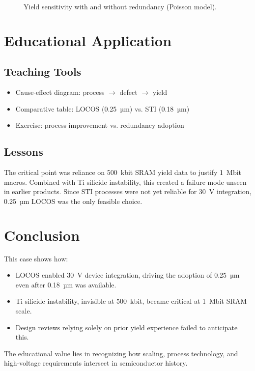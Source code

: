 \documentclass[conference]{IEEEtran}
\begin{document}
\begin{figure}[!t]
  \centering
  \caption{Yield sensitivity with and without redundancy (Poisson model).}
  \label{fig:yield}
\end{figure}

\section{Educational Application}
\subsection{Teaching Tools}
\begin{itemize}
  \item Cause-effect diagram: process $\rightarrow$ defect $\rightarrow$ yield
  \item Comparative table: LOCOS (0.25~µm) vs. STI (0.18~µm)
  \item Exercise: process improvement vs. redundancy adoption
\end{itemize}

\subsection{Lessons}
The critical point was reliance on 500~kbit SRAM yield data to justify 1~Mbit macros.  
Combined with Ti silicide instability, this created a failure mode unseen in earlier products.  
Since STI processes were not yet reliable for 30~V integration, 0.25~µm LOCOS was the only feasible choice.

\section{Conclusion}
This case shows how:
\begin{itemize}
  \item LOCOS enabled 30~V device integration, driving the adoption of 0.25~µm even after 0.18~µm was available.
  \item Ti silicide instability, invisible at 500~kbit, became critical at 1~Mbit SRAM scale.
  \item Design reviews relying solely on prior yield experience failed to anticipate this.
\end{itemize}
The educational value lies in recognizing how scaling, process technology, and high-voltage requirements intersect in semiconductor history.
\end{document}
